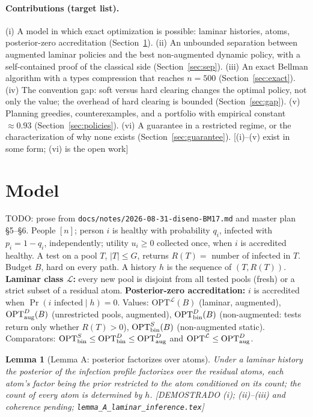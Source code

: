 \documentclass[11pt]{article}
\newtheorem{lemma}[theorem]{Lemma}
\theoremstyle{remark}
\newcommand{\status}[1]{\textcolor{blue!60!black}{\textsf{\small [#1]}}}
\newcommand{\todo}[1]{\textcolor{red!70!black}{\textsf{\small TODO: #1}}}
\newcommand{\OPT}{\mathrm{OPT}}
\newcommand{\Lam}{\mathcal L}
\begin{document}
\paragraph{Contributions (target list).} (i) A model in which exact optimization is possible: laminar histories, atoms, posterior-zero accreditation (Section~\ref{sec:model}). (ii) An unbounded separation between augmented laminar policies and the best non-augmented dynamic policy, with a self-contained proof of the classical side (Section~\ref{sec:sep}). (iii) An exact Bellman algorithm with a types compression that reaches $n=500$ (Section~\ref{sec:exact}). (iv) The convention gap: soft versus hard clearing changes the optimal policy, not only the value; the overhead of hard clearing is bounded (Section~\ref{sec:gap}). (v) Planning greedies, counterexamples, and a portfolio with empirical constant $\approx0.93$ (Section~\ref{sec:policies}). (vi) A guarantee in a restricted regime, or the characterization of why none exists (Section~\ref{sec:guarantee}). \status{(i)--(v) exist in some form; (vi) is the open work}

\section{Model}\label{sec:model}
\todo{prose from \texttt{docs/notes/2026-08-31-diseno-BM17.md} and master plan §5--§6.}
People $[n]$; person $i$ is healthy with probability $q_i$, infected with $p_i=1-q_i$, independently; utility $u_i\ge0$ collected once, when $i$ is accredited healthy. A test on a pool $T$, $|T|\le G$, returns $R(T)=$ number of infected in $T$. Budget $B$, hard on every path. A history $h$ is the sequence of $(T,R(T))$. \textbf{Laminar class $\Lam$:} every new pool is disjoint from all tested pools (fresh) or a strict subset of a residual atom. \textbf{Posterior-zero accreditation:} $i$ is accredited when $\Pr(i\text{ infected}\mid h)=0$. Values: $\OPT^{\Lam}(B)$ (laminar, augmented), $\OPT^{D}_{\rm aug}(B)$ (unrestricted pools, augmented), $\OPT^{D}_{\rm bin}(B)$ (non-augmented: tests return only whether $R(T)>0$), $\OPT^{S}_{\rm bin}(B)$ (non-augmented static). Comparators: $\OPT^{S}_{\rm bin}\le\OPT^{D}_{\rm bin}\le\OPT^{D}_{\rm aug}$ and $\OPT^{\Lam}\le\OPT^{D}_{\rm aug}$.

\begin{lemma}[Lemma A: posterior factorizes over atoms]\label{lem:A}
Under a laminar history the posterior of the infection profile factorizes over the residual atoms, each atom's factor being the prior restricted to the atom conditioned on its count; the count of every atom is determined by $h$. \status{DEMOSTRADO (i); (ii)--(iii) and coherence pending; \texttt{lemma\_A\_laminar\_inference.tex}}
\end{lemma}
\end{document}
